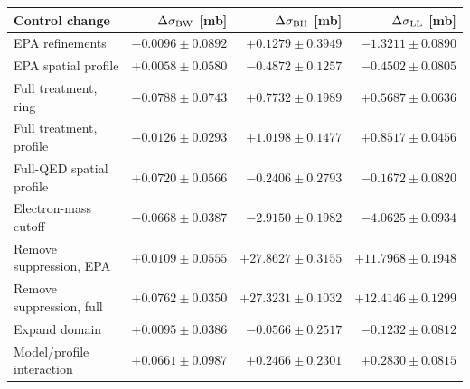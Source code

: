\begin{tabular}{@{}lrrr@{}}
\toprule
Control change & $\Delta\sigma_{\rm BW}$ [mb] & $\Delta\sigma_{\rm BH}$ [mb] & $\Delta\sigma_{\rm LL}$ [mb]\\
\midrule
EPA refinements & $-0.0096\pm0.0892$ & $+0.1279\pm0.3949$ & $-1.3211\pm0.0890$\\
EPA spatial profile & $+0.0058\pm0.0580$ & $-0.4872\pm0.1257$ & $-0.4502\pm0.0805$\\
Full treatment, ring & $-0.0788\pm0.0743$ & $+0.7732\pm0.1989$ & $+0.5687\pm0.0636$\\
Full treatment, profile & $-0.0126\pm0.0293$ & $+1.0198\pm0.1477$ & $+0.8517\pm0.0456$\\
Full-QED spatial profile & $+0.0720\pm0.0566$ & $-0.2406\pm0.2793$ & $-0.1672\pm0.0820$\\
Electron-mass cutoff & $-0.0668\pm0.0387$ & $-2.9150\pm0.1982$ & $-4.0625\pm0.0934$\\
Remove suppression, EPA & $+0.0109\pm0.0555$ & $+27.8627\pm0.3155$ & $+11.7968\pm0.1948$\\
Remove suppression, full & $+0.0762\pm0.0350$ & $+27.3231\pm0.1032$ & $+12.4146\pm0.1299$\\
Expand domain & $+0.0095\pm0.0386$ & $-0.0566\pm0.2517$ & $-0.1232\pm0.0812$\\
Model/profile interaction & $+0.0661\pm0.0987$ & $+0.2466\pm0.2301$ & $+0.2830\pm0.0815$\\
\bottomrule
\end{tabular}
